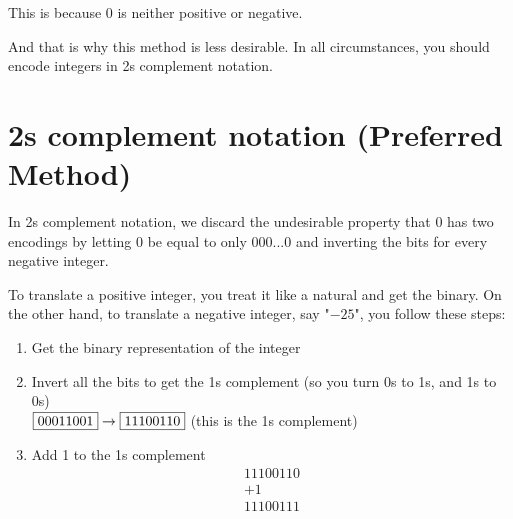 \documentclass{article}
\begin{document}
\noindent This is because 0 is neither positive or negative.\\

\begin{center}
\end{center}

\vspace{\baselineskip}
\noindent And that is why this method is less desirable. In all circumstances, you should encode integers in 2s complement notation.

\section{2s complement notation (Preferred Method)}

In 2s complement notation, we discard the undesirable property that 0 has two encodings by letting 0 be equal to only $000...0$ and inverting the bits for every negative integer.

\vspace{\baselineskip}
\begin{center}
\end{center}

\noindent To translate a positive integer, you treat it like a natural and get the binary. On the other hand, to translate  a negative integer, say "$-25$", you follow these steps:
\begin{enumerate}
    \item Get the binary representation of the integer \\
    \item Invert all the bits to get the 1s complement (so you turn 0s to 1s, and 1s to 0s) \\
    $\fbox{00011001}\rightarrow\fbox{11100110}$ (this is the 1s complement)
    \item Add 1 to the 1s complement \\
        \[
        \begin{array}{r}
            11100110 \\
        +  1 \\
        \hline
            11100111 \\
        \end{array}
        \]        
\end{enumerate}
\end{document}
